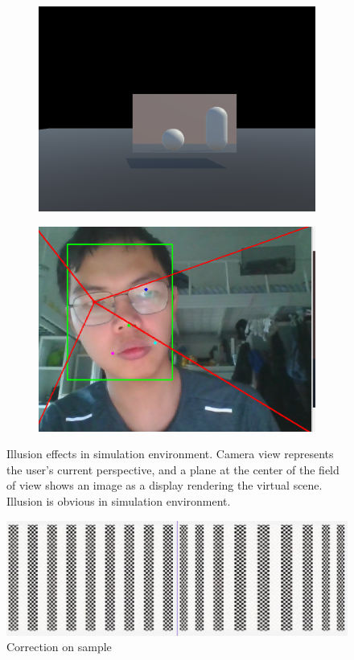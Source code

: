 \begin{figure}
\begin{subfigure}[t]{0.45\linewidth}
        \includegraphics[width=1\textwidth]{figures/Implementation/illusion_3.png}
    \end{subfigure}
    \begin{subfigure}[t]{0.45\linewidth}
        \centering
        \includegraphics[width=1\textwidth]{figures/Implementation/illusion_3_face.png}
    \end{subfigure}
    \caption{Illusion effects in simulation environment. Camera view represents the user's current perspective, and a plane at the center of the field of view shows an image as a display rendering the virtual scene. Illusion is obvious in simulation environment.}\label{F:test-b}
\end{figure}

\begin{figure}
    \centering
    \includegraphics[width=1\textwidth]{figures/Implementation/correction_example.png}
    \caption{Correction on sample}\label{F:test-a}
\end{figure}
\clearpage